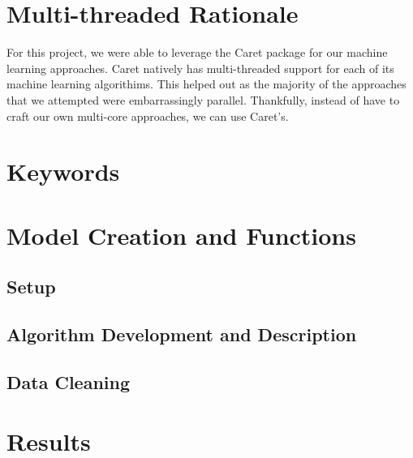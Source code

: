 \documentclass[paper=letter, fontsize=11pt]{scrartcl}
\numberwithin{equation}{section}		%
\numberwithin{figure}{section}			%
\numberwithin{table}{section}				%
\begin{document}
\begin{spacing}{2}
\section{Multi-threaded Rationale}
For this project, we were able to leverage the Caret package for our machine learning approaches. Caret natively has multi-threaded support for each of its machine learning algorithims. This helped out as the majority of the approaches that we attempted were embarrassingly parallel. Thankfully, instead of have to craft our own multi-core approaches, we can use Caret's.
\section{Keywords}
\section{Model Creation and Functions}
\subsection{Setup}
\subsection{Algorithm Development and Description}
\subsection{Data Cleaning}
\section{Results}





\end{spacing}

 
\end{document}
